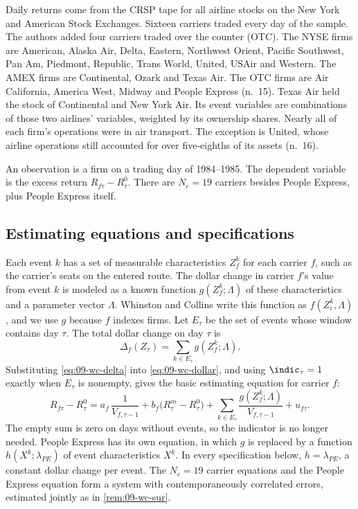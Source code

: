 Daily returns come from the CRSP tape for all airline stocks on the New York and American Stock
Exchanges. Sixteen carriers traded every day of the sample. The authors added four carriers traded
over the counter (OTC). The NYSE firms are American, Alaska Air, Delta, Eastern, Northwest Orient,
Pacific Southwest, Pan Am, Piedmont, Republic, Trans World, United, USAir and Western. The AMEX firms
are Continental, Ozark and Texas Air. The OTC firms are Air California, America West, Midway and
People Express (n.~15). Texas Air held the stock of Continental and New York Air. Its event variables are
combinations of those two airlines' variables, weighted by its ownership shares. Nearly all of each
firm's operations were in air transport. The exception is United, whose airline operations still
accounted for over five-eighths of its assets (n.~16).

An observation is a firm on a trading day of 1984--1985. The dependent variable is the excess return
$R_{f\tau}-R^0_\tau$. There are $N_c=19$ carriers besides People Express, plus People Express itself.

\subsection{Estimating equations and specifications}\label{sec:09-wc-spec}

Each event $k$ has a set of measurable characteristics $Z^k_f$ for each carrier $f$, such as the
carrier's seats on the entered route. The dollar change in carrier $f$'s value from event $k$ is
modeled as a known function $g(Z^k_f;\Lambda)$ of these characteristics and a parameter vector
$\Lambda$. Whinston and Collins write this function as $f(Z^k_i,\Lambda)$, and we use $g$ because $f$
indexes firms. Let $E_\tau$ be the set of events whose window contains day $\tau$. The total dollar
change on day $\tau$ is
\begin{equation}\label{eq:09-wc-delta}
\Delta_f(Z_\tau)=\sum_{k\in E_\tau}g(Z^k_f;\Lambda).
\end{equation}
Substituting \eqref{eq:09-wc-delta} into \eqref{eq:09-wc-dollar}, and using $\indic_\tau=1$ exactly
when $E_\tau$ is nonempty, gives the basic estimating equation for carrier $f$:
\begin{equation}\label{eq:09-wc-main}
R_{f\tau}-R^0_\tau=a_f\,\frac{1}{V_{f,\tau-1}}+b_f\big(R^m_\tau-R^0_\tau\big)
+\sum_{k\in E_\tau}\frac{g(Z^k_f;\Lambda)}{V_{f,\tau-1}}+u_{f\tau}.
\end{equation}
The empty sum is zero on days without events, so the indicator is no longer needed. People Express
has its own equation, in which $g$ is replaced by a function $h(X^k;\lambda_{PE})$ of event
characteristics $X^k$. In every specification below, $h=\lambda_{PE}$, a constant dollar change per
event. The $N_c=19$ carrier equations and the People Express equation form a system with
contemporaneously correlated errors, estimated jointly as in \cref{rem:09-wc-sur}.

